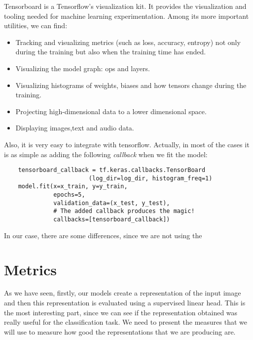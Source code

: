 Tensorboard is a Tensorflow's visualization kit. It provides the visualization and tooling needed for machine learning experimentation. Among its more important utilities, we can find:
\begin{itemize}
\item Tracking and visualizing metrics (such as loss, accuracy, entropy) not only during the training but also when the training time has ended.

\item Visualizing the model graph: ops and layers.

\item Visualizing histograms of weights, biases and how tensors change during the training.

\item Projecting high-dimensional data to a lower dimensional space.

\item Displaying images,text and audio data.
\end{itemize}

Also, it is very easy to integrate with tensorflow.  Actually, in most of the cases it is as simple as adding the following \emph{callback} when we fit the model:

\begin{verbatim}
    tensorboard_callback = tf.keras.callbacks.TensorBoard
                        (log_dir=log_dir, histogram_freq=1)
    model.fit(x=x_train, y=y_train, 
              epochs=5, 
              validation_data=(x_test, y_test),
              # The added callback produces the magic! 
              callbacks=[tensorboard_callback])  
\end{verbatim}

In our case, there are some differences, since we are not using the 

\section{Metrics}

As we have seen, firstly, our models create a representation of the input image and then this representation is evaluated using a supervised linear head. This is the most interesting part, since we can see if the representation obtained was really useful for the classification task. We need to present the measures that we will use to measure how good the representations that we are producing are.



